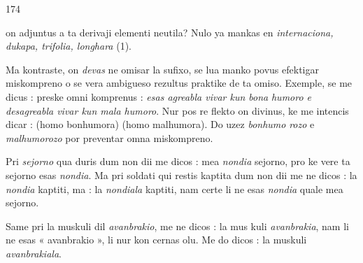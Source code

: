 \begin{VUpage}[178]{174}

\VUcontinue
on adjuntus a ta derivaji elementi neutila? Nulo ya mankas\nl
en \textit{internaciona, dukapa, trifolia, longhara} (1).

Ma kontraste, on \textit{devas} ne omisar la sufixo, se lua manko\nl
povus efektigar miskompreno o se vera ambigueso rezultus\nl
praktike de ta omiso. Exemple, se me dicus : \nl
{}\nl
preske omni komprenus : \textit{esas agreabla vivar kun bona}\nl
\textit{humoro e desagreabla vivar kun mala humoro}. Nur pos re\cc
flekto on divinus, ke me intencis dicar : \nl
{} (homo bonhumora) \nl
{} (homo malhumora). Do uzez \textit{bonhumo}\cc
\textit{rozo} e \textit{malhumorozo} por preventar omna miskompreno.

Pri \textit{sejorno} qua duris dum non dii me dicos : mea \textit{nondia}\nl
sejorno, pro ke vere ta sejorno esas \textit{nondia}. Ma pri soldati\nl
qui restis kaptita dum non dii me ne dicos : la \textit{nondia} kaptiti,\nl
ma : la \textit{nondiala} kaptiti, nam certe li ne esas \textit{nondia} quale\nl
mea sejorno.

Same pri la muskuli dil \textit{avanbrakio}, me ne dicos : la mus\cc
kuli \textit{avanbrakia}, nam li ne esas « avanbrakio », li nur kon\cc
cernas olu. Me do dicos : la muskuli \textit{avanbrakiala}.


\end{VUpage}

